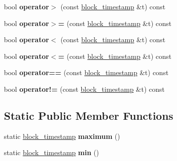 \begin{DoxyCompactItemize}
bool {\bfseries operator$>$} (const \mbox{\hyperlink{classaacio_1_1chain_1_1block__timestamp}{block\+\_\+timestamp}} \&t) const
\item 
\mbox{\label{classaacio_1_1chain_1_1block__timestamp_a9256d6a0a29d372c866e935820315a5e}} 
bool {\bfseries operator$>$=} (const \mbox{\hyperlink{classaacio_1_1chain_1_1block__timestamp}{block\+\_\+timestamp}} \&t) const
\item 
\mbox{\label{classaacio_1_1chain_1_1block__timestamp_a6c55afe70f6fd660ece8d5052fe310cc}} 
bool {\bfseries operator$<$} (const \mbox{\hyperlink{classaacio_1_1chain_1_1block__timestamp}{block\+\_\+timestamp}} \&t) const
\item 
\mbox{\label{classaacio_1_1chain_1_1block__timestamp_af0894035211015ed60306f6cdec1256d}} 
bool {\bfseries operator$<$=} (const \mbox{\hyperlink{classaacio_1_1chain_1_1block__timestamp}{block\+\_\+timestamp}} \&t) const
\item 
\mbox{\label{classaacio_1_1chain_1_1block__timestamp_a536eb5a1837b36d54d4811a4124e0c04}} 
bool {\bfseries operator==} (const \mbox{\hyperlink{classaacio_1_1chain_1_1block__timestamp}{block\+\_\+timestamp}} \&t) const
\item 
\mbox{\label{classaacio_1_1chain_1_1block__timestamp_af94314288e0a623c065c74009cdac6c0}} 
bool {\bfseries operator!=} (const \mbox{\hyperlink{classaacio_1_1chain_1_1block__timestamp}{block\+\_\+timestamp}} \&t) const
\end{DoxyCompactItemize}
\subsection*{Static Public Member Functions}
\begin{DoxyCompactItemize}
\item 
\mbox{\label{classaacio_1_1chain_1_1block__timestamp_a539e6c5f4e478ead66f4aedf13d8d7e7}} 
static \mbox{\hyperlink{classaacio_1_1chain_1_1block__timestamp}{block\+\_\+timestamp}} {\bfseries maximum} ()
\item 
\mbox{\label{classaacio_1_1chain_1_1block__timestamp_a4248ca5486157613e260f9bcbce90d70}} 
static \mbox{\hyperlink{classaacio_1_1chain_1_1block__timestamp}{block\+\_\+timestamp}} {\bfseries min} ()
\end{DoxyCompactItemize}
